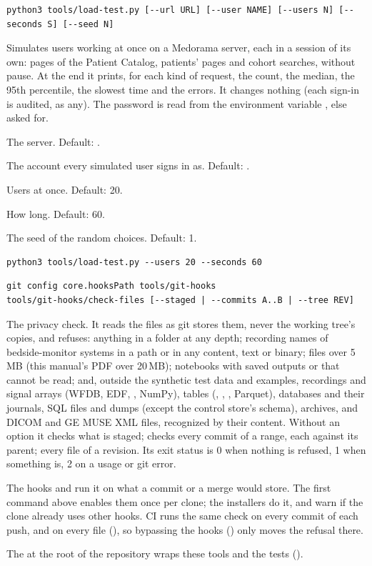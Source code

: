 \begin{lstlisting}[style=signature]
python3 tools/load-test.py [--url URL] [--user NAME] [--users N] [--seconds S] [--seed N]
\end{lstlisting}
Simulates users working at once on a Medorama server, each in a session of its own: pages of
the Patient Catalog, patients' pages and cohort searches, without pause. At the end it prints,
for each kind of request, the count, the median, the 95th percentile, the slowest time and the
errors. It changes nothing (each sign-in is audited, as any). The password is read from the
environment variable , else asked for.
\begin{params}
\item[--url URL] The server. Default: .
\item[--user NAME] The account every simulated user signs in as. Default: .
\item[--users N] Users at once. Default: 20.
\item[--seconds S] How long. Default: 60.
\item[--seed N] The seed of the random choices. Default: 1.
\end{params}
\begin{lstlisting}[style=shell]
python3 tools/load-test.py --users 20 --seconds 60
\end{lstlisting}

\begin{lstlisting}[style=signature]
git config core.hooksPath tools/git-hooks
tools/git-hooks/check-files [--staged | --commits A..B | --tree REV]
\end{lstlisting}
The privacy check. It reads the files as git stores them, never the working tree's copies, and
refuses: anything in a  folder at any depth; recording names of
bedside-monitor systems in a path or in any content, text or binary; files over 5\,MB (this manual's PDF over 20\,MB); notebooks
with saved outputs or that cannot be read; and, outside the synthetic test data and examples,
recordings and signal arrays (WFDB, EDF, , NumPy), tables (, ,
, Parquet), databases and their journals, SQL files and dumps (except the control store's
schema), archives, and DICOM and GE MUSE XML files, recognized by their content. Without an
option it checks what is staged;  checks every commit of a range, each
against its parent;  every file of a revision. Its exit status is 0 when
nothing is refused, 1 when something is, 2 on a usage or git error.

The hooks  and  run it on what a commit or a merge would
store. The first command above enables them once per clone; the installers do it, and warn if
the clone already uses other hooks. CI runs the same check on every commit of each push, and on
every file (), so bypassing the hooks
() only moves the refusal there.

The  at the root of the repository wraps these tools and the tests
().
